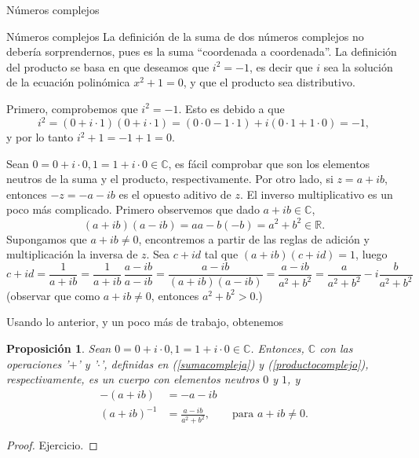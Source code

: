 \documentclass[a4paper,12pt,twoside,spanish]{amsbook}
\newtheorem{proposicion}[teorema]{Proposici\'on}
\theoremstyle{definition}
\theoremstyle{remark}
\newcommand{\R}{\mathbb R}
\newcommand{\C}{\mathbb C}
\begin{document}
\begin{chapter}{Números complejos}
\begin{section}{Números complejos}
		La definición de la suma de dos números complejos no debería sorprendernos, pues es la suma ``coordenada a coordenada''. La definición del producto se basa en que deseamos que $i^2 = -1$,  es decir que $i$  sea la solución de la ecuación polinómica $x^2 + 1 =0$,   y que el producto sea distributivo. 	
		
		Primero, comprobemos que  $i^2 = -1$. Esto es debido a que
		\begin{equation*}
		i^2 = (0 + i\cdot 1)(0 + i\cdot 1) = (0\cdot 0 - 1 \cdot 1) + i(0\cdot 1 + 1 \cdot 0) = -1,
		\end{equation*} 
		y por lo tanto $i^2 + 1 = -1+1 = 0$.  
		
		
		Sean $0 = 0 + i\cdot 0, 1 = 1 + i\cdot 0 \in \C$,  es fácil comprobar que son los elementos neutros de la suma y el producto,  respectivamente. Por otro lado, si $z = a + ib$,  entonces $-z = -a -ib$ es el opuesto aditivo de $z$. 
		El inverso multiplicativo es un poco más complicado. Primero observemos que dado $a+ib \in \C$,
		\begin{equation*}
		(a+ ib)(a-ib) = aa -b(-b) = a^2 + b^2 \in \R. 
		\end{equation*}
		Supongamos que $a+ib\ne0$,  encontremos  a partir  de las reglas de adición y multiplicación la inversa de $z$. Sea $c+id$ tal que $(a+ib)(c+id)=1$, luego
		\begin{equation*}
		c + id = \frac{1}{a+ib} = \frac{1}{a+ib}\,\frac{a-ib}{a-ib} = \frac{a-ib}{(a+ib)(a-ib)} = 
		\frac{a-ib}{ a^2 + b^2} = \frac{a}{ a^2 + b^2} - i\frac{b}{ a^2 + b^2}
		\end{equation*}  
		(observar que como $a+ib\ne0$,  entonces $a^2 + b^2 >0$.)
		
		Usando lo anterior,  y un poco más de trabajo, obtenemos
		
		\begin{proposicion}
			Sean $0 = 0 + i\cdot 0, 1 = 1 + i\cdot 0\in \C$. Entonces, $\C$ con las operaciones '$+$' y '$\cdot$', definidas en (\ref{sumacompleja}) y (\ref{productocomplejo}),  respectivamente, es un cuerpo con elementos neutros $0$ y $1$, y
			\begin{align*}
			-(a+ib) &= -a -ib \\
			(a+ib)^{-1} &= 	\frac{a-ib}{ a^2 + b^2}, \qquad \text{para $a+ib \ne 0$}.
			\end{align*}
		\end{proposicion}
		\begin{proof}
			Ejercicio.
		\end{proof}
		

\end{section}
\end{chapter}
\end{document}
